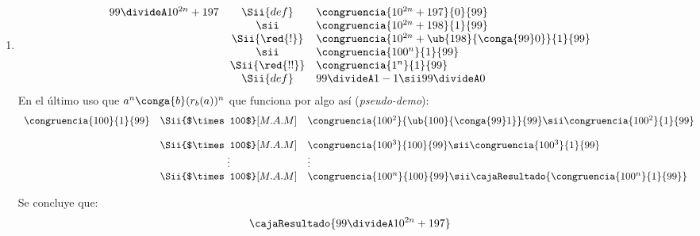 \begin{enumerate}[label=\alph*)]
  \item
        $$
          \begin{array}{rcl}
            99 \divideA 10^{2n} + 197 & \Sii{def}      & \congruencia{10^{2n} + 197}{0}{99}                    \\
                                      & \sii           & \congruencia{10^{2n} + 198}{1}{99}                    \\
                                      & \Sii{\red{!}}  & \congruencia{10^{2n} + \ub{198}{\conga{99} 0}}{1}{99} \\
                                      & \sii           & \congruencia{100^n}{1}{99}                            \\
                                      & \Sii{\red{!!}} & \congruencia{1^n}{1}{99}                              \\
                                      & \Sii{def}      & 99 \divideA 1 - 1 \sii 99 \divideA 0                  \\
          \end{array}
        $$
        En el último \red{!!} uso que $a^n \conga{b} (r_b(a))^n$ que funciona por algo así (\textit{pseudo-demo}):
        $$
          \begin{array}{rcl}
            \congruencia{100}{1}{99} & \Sii{$\times 100$}[M.A.M] & \congruencia{100^2}{\ub{100}{ \conga{99} 1 }}{99} \sii \congruencia{100^2}{1}{99} \\\\
                                     & \Sii{$\times 100$}[M.A.M] & \congruencia{100^3}{100}{99} \sii \congruencia{100^3}{1}{99}                      \\
                                     & \vdots                    & \vdots                                                                            \\
                                     & \Sii{$\times 100$}[M.A.M] & \congruencia{100^n}{100}{99} \sii \cajaResultado{\congruencia{100^n}{1}{99} }     \\
          \end{array}
        $$

        Se concluye que:
        $$
          \cajaResultado{
            99 \divideA 10^{2n} + 197
          }
        $$


\end{enumerate}
